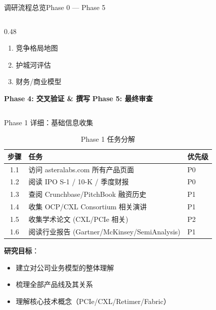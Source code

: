 \documentclass[UTF8,11pt,aspectratio=169]{beamer}
\begin{document}
\begin{frame}{调研流程总览}{Phase 0 — Phase 5}
\begin{columns}[T]
\begin{column}{0.48\textwidth}
            \begin{enumerate}
                \item 竞争格局地图
                \item 护城河评估
                \item 财务/商业模型
            \end{enumerate}
            \vspace{0.3cm}
            \textbf{Phase 4: 交叉验证 \& 撰写}
            \vspace{0.3cm}
            \textbf{Phase 5: 最终审查}
        \end{column}
    \end{columns}
\end{frame}

\begin{frame}{Phase 1 详细：基础信息收集}
    \begin{table}
        \centering
        \caption{Phase 1 任务分解}
        \begin{tabular}{cll}
            \toprule
            \textbf{步骤} & \textbf{任务} & \textbf{优先级} \\
            \midrule
            1.1 & 访问 asteralabs.com 所有产品页面 & P0 \\
            1.2 & 阅读 IPO S-1 / 10-K / 季度财报 & P0 \\
            1.3 & 查阅 Crunchbase/PitchBook 融资历史 & P1 \\
            1.4 & 收集 OCP/CXL Consortium 相关演讲 & P1 \\
            1.5 & 收集学术论文 (CXL/PCIe 相关) & P2 \\
            1.6 & 阅读行业报告 (Gartner/McKinsey/SemiAnalysis) & P1 \\
            \bottomrule
        \end{tabular}
    \end{table}

    \textbf{研究目标}：
    \begin{itemize}
        \item 建立对公司业务模型的整体理解
        \item 梳理全部产品线及其关系
        \item 理解核心技术概念（PCIe/CXL/Retimer/Fabric）
    \end{itemize}
\end{frame}
\end{document}
